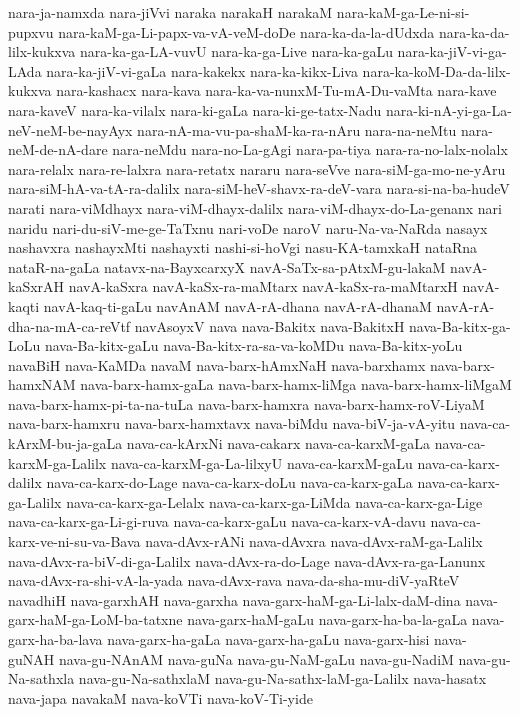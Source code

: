 {nara-ja-namxda
nara-jiVvi
naraka
narakaH
narakaM
nara-kaM-ga-Le-ni-si-pupxvu
nara-kaM-ga-Li-papx-va-vA-veM-doDe
nara-ka-da-la-dUdxda
nara-ka-da-lilx-kukxva
nara-ka-ga-LA-vuvU
nara-ka-ga-Live
nara-ka-gaLu
nara-ka-jiV-vi-ga-LAda
nara-ka-jiV-vi-gaLa
nara-kakekx
nara-ka-kikx-Liva
nara-ka-koM-Da-da-lilx-kukxva
nara-kashacx
nara-kava
nara-ka-va-nunxM-Tu-mA-Du-vaMta
nara-kave
nara-kaveV
nara-ka-vilalx
nara-ki-gaLa
nara-ki-ge-tatx-Nadu
nara-ki-nA-yi-ga-La-neV-neM-be-nayAyx
nara-nA-ma-vu-pa-shaM-ka-ra-nAru
nara-na-neMtu
nara-neM-de-nA-dare
nara-neMdu
nara-no-La-gAgi
nara-pa-tiya
nara-ra-no-lalx-nolalx
nara-relalx
nara-re-lalxra
nara-retatx
nararu
nara-seVve
nara-siM-ga-mo-ne-yAru
nara-siM-hA-va-tA-ra-dalilx
nara-siM-heV-shavx-ra-deV-vara
nara-si-na-ba-hudeV
narati
nara-viMdhayx
nara-viM-dhayx-dalilx
nara-viM-dhayx-do-La-genanx
nari
naridu
nari-du-siV-me-ge-TaTxnu
nari-voDe
naroV
naru-Na-va-NaRda
nasayx
nashavxra
nashayxMti
nashayxti
nashi-si-hoVgi
nasu-KA-tamxkaH
nataRna
nataR-na-gaLa
natavx-na-BayxcarxyX
navA-SaTx-sa-pAtxM-gu-lakaM
navA-kaSxrAH
navA-kaSxra
navA-kaSx-ra-maMtarx
navA-kaSx-ra-maMtarxH
navA-kaqti
navA-kaq-ti-gaLu
navAnAM
navA-rA-dhana
navA-rA-dhanaM
navA-rA-dha-na-mA-ca-reVtf
navAsoyxV
nava
nava-Bakitx
nava-BakitxH
nava-Ba-kitx-ga-LoLu
nava-Ba-kitx-gaLu
nava-Ba-kitx-ra-sa-va-koMDu
nava-Ba-kitx-yoLu
navaBiH
nava-KaMDa
navaM
nava-barx-hAmxNaH
nava-barxhamx
nava-barx-hamxNAM
nava-barx-hamx-gaLa
nava-barx-hamx-liMga
nava-barx-hamx-liMgaM
nava-barx-hamx-pi-ta-na-tuLa
nava-barx-hamxra
nava-barx-hamx-roV-LiyaM
nava-barx-hamxru
nava-barx-hamxtavx
nava-biMdu
nava-biV-ja-vA-yitu
nava-ca-kArxM-bu-ja-gaLa
nava-ca-kArxNi
nava-cakarx
nava-ca-karxM-gaLa
nava-ca-karxM-ga-Lalilx
nava-ca-karxM-ga-La-lilxyU
nava-ca-karxM-gaLu
nava-ca-karx-dalilx
nava-ca-karx-do-Lage
nava-ca-karx-doLu
nava-ca-karx-gaLa
nava-ca-karx-ga-Lalilx
nava-ca-karx-ga-Lelalx
nava-ca-karx-ga-LiMda
nava-ca-karx-ga-Lige
nava-ca-karx-ga-Li-gi-ruva
nava-ca-karx-gaLu
nava-ca-karx-vA-davu
nava-ca-karx-ve-ni-su-va-Bava
nava-dAvx-rANi
nava-dAvxra
nava-dAvx-raM-ga-Lalilx
nava-dAvx-ra-biV-di-ga-Lalilx
nava-dAvx-ra-do-Lage
nava-dAvx-ra-ga-Lanunx
nava-dAvx-ra-shi-vA-la-yada
nava-dAvx-rava
nava-da-sha-mu-diV-yaRteV
navadhiH
nava-garxhAH
nava-garxha
nava-garx-haM-ga-Li-lalx-daM-dina
nava-garx-haM-ga-LoM-ba-tatxne
nava-garx-haM-gaLu
nava-garx-ha-ba-la-gaLa
nava-garx-ha-ba-lava
nava-garx-ha-gaLa
nava-garx-ha-gaLu
nava-garx-hisi
nava-guNAH
nava-gu-NAnAM
nava-guNa
nava-gu-NaM-gaLu
nava-gu-NadiM
nava-gu-Na-sathxla
nava-gu-Na-sathxlaM
nava-gu-Na-sathx-laM-ga-Lalilx
nava-hasatx
nava-japa
navakaM
nava-koVTi
nava-koV-Ti-yide
}
